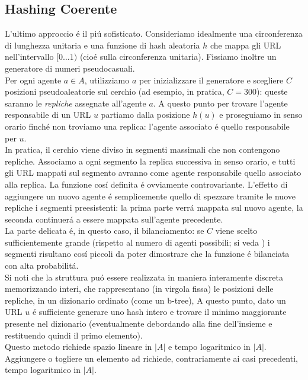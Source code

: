 \subsection{Hashing Coerente}
L'ultimo approccio é il piú sofisticato. Consideriamo idealmente una circonferenza di lunghezza unitaria e una funzione di hash aleatoria $h$ che mappa gli URL nell'intervallo $[0\dots1)$ (cioé sulla circonferenza unitaria). Fissiamo inoltre un generatore di numeri pseudocasuali.\\
Per ogni agente $a \in A$, utilizziamo $a$ per inizializzare il generatore e scegliere $C$ posizioni pseudoaleatorie sul cerchio (ad esempio, in pratica, $C = 300$): queste saranno le \textit{repliche} assegnate all'agente $a$. A questo punto per trovare l'agente responsabile di un URL $u$ partiamo dalla posizione $h(u)$ e proseguiamo in senso orario finché non troviamo una replica: l'agente associato é quello responsabile per $u$.\\
In pratica, il cerchio viene diviso in segmenti massimali che non contengono repliche. Associamo a ogni segmento la replica successiva in senso orario, e tutti gli URL mappati sul segmento avranno come agente responsabile quello associato alla replica. La funzione cosí definita é ovviamente controvariante. L'effetto di aggiungere un nuovo agente é semplicemente quello di spezzare tramite le nuove repliche i segmenti preesistenti: la prima parte verrá mappata sul nuovo agente, la seconda continuerá a essere mappata sull'agente precedente.\\
La parte delicata é, in questo caso, il bilanciamento: se $C$ viene scelto sufficientemente grande (rispetto al numero di agenti possibili; si veda %
) i segmenti risultano cosí piccoli da poter dimostrare che la funzione é bilanciata con alta probabilitá.\\
Si noti che la struttura puó essere realizzata in maniera interamente discreta memorizzando interi, che rappresentano (in virgola fissa) le posizioni delle repliche, in un dizionario ordinato (come un b-tree), A questo punto, dato un URL $u$ é sufficiente generare uno hash intero e trovare il minimo maggiorante presente nel dizionario (eventualmente debordando alla fine dell'insieme e restituendo quindi il primo elemento).\\
Questo metodo richiede spazio lineare in $|A|$ e tempo logaritmico in $|A|$. Aggiungere o togliere un elemento ad  richiede, contrariamente ai casi precedenti, tempo logaritmico in $|A|$.
